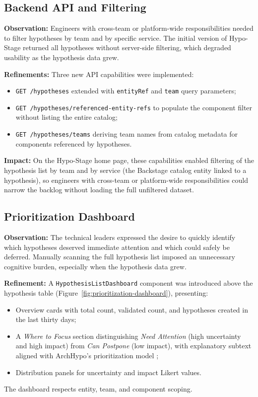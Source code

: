 \subsection{Backend API and Filtering}
\label{subsec:refinement-api}

\textbf{Observation:} Engineers with cross-team or platform-wide responsibilities
needed to filter hypotheses by team and by specific service. The initial
version of Hypo-Stage returned all hypotheses without server-side filtering,
which degraded usability as the hypothesis data grew.

\textbf{Refinements:} Three new API capabilities were implemented:
\begin{itemize}
  \item \texttt{GET /hypotheses} extended with \texttt{entityRef} and \texttt{team}
    query parameters;
  \item \texttt{GET /hypotheses/referenced-entity-refs} to populate the component
    filter without listing the entire catalog;
  \item \texttt{GET /hypotheses/teams} deriving team names from catalog metadata
    for components referenced by hypotheses.
\end{itemize}

\textbf{Impact:} On the Hypo-Stage home page, these capabilities enabled filtering
of the hypothesis list by team and by service (the Backstage catalog entity linked
to a hypothesis), so engineers with cross-team or platform-wide responsibilities
could narrow the backlog without loading the full unfiltered dataset.

\subsection{Prioritization Dashboard}
\label{subsec:refinement-dashboard}

\textbf{Observation:} The technical leaders expressed the desire to quickly
identify which hypotheses deserved immediate attention and which could safely be
deferred. Manually scanning the full hypothesis list imposed an unnecessary
cognitive burden, especially when the hypothesis data grew.

\textbf{Refinement:} A \texttt{HypothesisListDashboard} component was introduced
above the hypothesis table (Figure~\ref{fig:prioritization-dashboard}), presenting:
\begin{itemize}
  \item Overview cards with total count, validated count, and hypotheses created
    in the last thirty days;
  \item A \textit{Where to Focus} section distinguishing \textit{Need Attention}
    (high uncertainty and high impact) from \textit{Can Postpone} (low impact),
    with explanatory subtext aligned with ArchHypo's prioritization model
    \citep{silva2025archhypo};
  \item Distribution panels for uncertainty and impact Likert values.
\end{itemize}
The dashboard respects entity, team, and component scoping.

